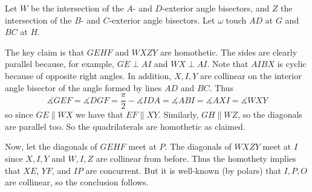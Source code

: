 Let $W$ be the intersection of the $A$- and $D$-exterior angle bisectors, and $Z$ the intersection of the $B$- and $C$-exterior angle bisectors. Let $\omega$ touch $AD$ at $G$ and $BC$ at $H$.

The key claim is that $GEHF$ and $WXZY$ are homothetic. The sides are clearly parallel because, for example, $GE\perp AI$ and $WX\perp AI$. Note that $AIBX$ is cyclic because of opposite right angles. In addition, $X,I,Y$ are collinear on the interior angle bisector of the angle formed by lines $AD$ and $BC$. Thus
\[
	\measuredangle{GEF}=\measuredangle{DGF}=\frac{\pi}{2}-\measuredangle{IDA}=\measuredangle{ABI}=\measuredangle{AXI}=\measuredangle{WXY}
\]
so since $GE\parallel WX$ we have that $EF\parallel XY$. Similarly, $GH\parallel WZ$, so the diagonals are parallel too. So the quadrilaterals are homothetic as claimed.

Now, let the diagonals of $GEHF$ meet at $P$. The diagonals of $WXZY$ meet at $I$ since $X,I,Y$ and $W,I,Z$ are collinear from before. Thus the homothety implies that $XE$, $YF$, and $IP$ are concurrent. But it is well-known (by polars) that $I,P,O$ are collinear, so the conclusion follows.